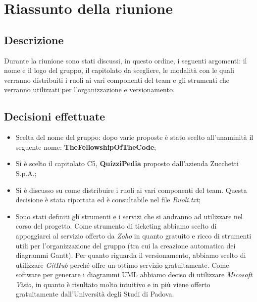 \section{Riassunto della riunione}
\subsection{Descrizione}

Durante la riunione sono stati discussi, in questo ordine, i seguenti argomenti: il nome e il logo del gruppo, il capitolato da scegliere, le modalità con le quali verranno distribuiti i ruoli ai vari componenti del team e gli strumenti che verranno utilizzati per l'organizzazione e versionamento.

\subsection{Decisioni effettuate}
\begin{itemize}
\item Scelta del nome del gruppo: dopo varie proposte è stato scelto all'unaminità il seguente nome: \textbf{TheFellowshipOfTheCode};
\item Si è scelto il capitolato C5, \textbf{QuizziPedia} proposto dall'azienda Zucchetti S.p.A.;
\item Si è discusso su come distribuire i ruoli ai vari componenti del team. Questa decisione è stata riportata ed è consultabile nel file \textsl{Ruoli.txt};
\item Sono stati definiti gli strumenti e i servizi che si andranno ad utilizzare nel corso del progetto. Come strumento di ticketing abbiamo scelto di appoggiarci al servizio offerto da \textsl{Zoho} in quanto gratuito e ricco di strumenti utili per l'organizzazione del gruppo (tra cui la creazione automatica dei diagrammi Gantt). Per quanto riguarda il versionamento, abbiamo scelto di utilizzare \textsl{GitHub} perché offre un ottimo servizio gratuitamente. Come software per generare i diagrammi UML abbiamo deciso di utilizzare \textsl{Micosoft Visio}, in quanto è risultato molto intuitivo e in più viene offerto gratuitamente dall'Università degli Studi di Padova.
\end{itemize}